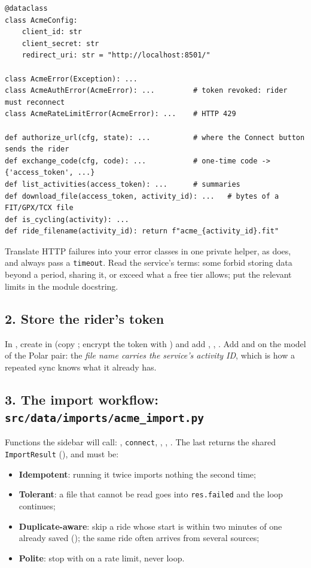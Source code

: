 \begin{lstlisting}
@dataclass
class AcmeConfig:
    client_id: str
    client_secret: str
    redirect_uri: str = "http://localhost:8501/"

class AcmeError(Exception): ...
class AcmeAuthError(AcmeError): ...         # token revoked: rider must reconnect
class AcmeRateLimitError(AcmeError): ...    # HTTP 429

def authorize_url(cfg, state): ...          # where the Connect button sends the rider
def exchange_code(cfg, code): ...           # one-time code -> {'access_token', ...}
def list_activities(access_token): ...      # summaries
def download_file(access_token, activity_id): ...   # bytes of a FIT/GPX/TCX file
def is_cycling(activity): ...
def ride_filename(activity_id): return f"acme_{activity_id}.fit"
\end{lstlisting}

Translate HTTP failures into your error classes in one private  helper, as  does, and
always pass a \texttt{timeout}. Read the service's terms: some forbid storing data beyond a period, sharing it, or
exceed what a free tier allows; put the relevant limits in the module docstring.

\subsection*{2. Store the rider's token}

In , create  in  (copy ; encrypt the token with ) and add
, , . Add
 and  on the model of the Polar pair: the
\emph{file name carries the service's activity ID}, which is how a repeated sync knows what it already has.

\subsection*{3. The import workflow: \texttt{src/data/imports/acme\_import.py}}

Functions the sidebar will call: , \texttt{connect}, ,
, . The last returns the shared \texttt{ImportResult}
(), and must be:

\begin{itemize}
\item \textbf{Idempotent}: running it twice imports nothing the second time;
\item \textbf{Tolerant}: a file that cannot be read goes into \texttt{res.failed} and the loop continues;
\item \textbf{Duplicate-aware}: skip a ride whose start is within two minutes of one already saved
  (); the same ride often arrives from several sources;
\item \textbf{Polite}: stop with  on a rate limit, never loop.
\end{itemize}

